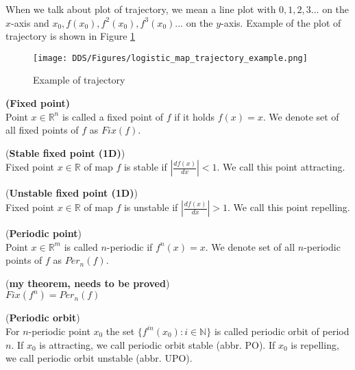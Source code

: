 \begin{remark}
    When we talk about plot of trajectory, we mean a line plot with
    $0, 1, 2, 3...$ on the $x$-axis and $x_0, f(x_0), f^2(x_0), f^3(x_0)...$ on the $y$-axis.
    Example of the plot of trajectory is shown in Figure \ref{fig:trajectory_example}
\end{remark}

\begin{figure}[!h]
    \centering
    \texttt{[image: DDS/Figures/logistic\_map\_trajectory\_example.png]}
    \caption{Example of trajectory}
    \label{fig:trajectory_example}
\end{figure}


\begin{definition} \textbf{(Fixed point)} \\
    \label{def:fixed point}
    Point $x \in \mathbb{R}^n$ is called a fixed point of $f$ if it holds $f(x) = x$.
    We denote set of all fixed points of $f$ as $Fix(f)$. \cite{Devaney20211026}
\end{definition}

\begin{definition} (\textbf{Stable fixed point (1D)})\\
    Fixed point $x \in \mathbb{R}$ of map $f$ is stable if $|\frac{d{f(x)}}{dx}| < 1$.
    We call this point attracting.
\end{definition}

\begin{definition} (\textbf{Unstable fixed point (1D)})\\
    Fixed point $x \in \mathbb{R}$ of map $f$ is unstable if $|\frac{d{f(x)}}{dx}| > 1$.
    We call this point repelling.
\end{definition}

\begin{definition} (\textbf{Periodic point})\\
    Point $x \in \mathbb{R}^m$ is called $n$-periodic if $f^{n}(x)=x$.
    We denote set of all $n$-periodic points of $f$ as $Per_{n}(f)$. \cite{Devaney20211026}
\end{definition}

\begin{theorem} (\textbf{my theorem, needs to be proved})\\
$Fix(f^n) = Per_n(f)$
\end{theorem}

\begin{definition} (\textbf{Periodic orbit})\\
    For $n$-periodic point $x_0$ the set $\{f^{in}(x_0):i \in \mathbb{N}\}$ is called periodic orbit of period $n$.
    If $x_0$ is attracting, we call periodic orbit stable (abbr. PO).
    If $x_0$ is repelling, we call periodic orbit unstable (abbr. UPO).
\end{definition}

